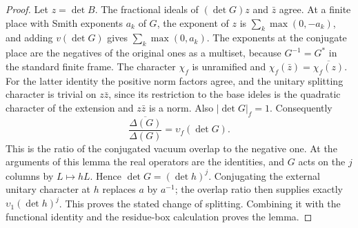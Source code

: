 \documentclass[a4paper,11pt]{article}
\theoremstyle{definition}
\theoremstyle{remark}
\numberwithin{equation}{section}
\begin{document}
\begin{proof}
Let \(z=\det B\). The fractional ideals of \((\det G)z\)
and \(\bar z\) agree. At a finite place with Smith exponents
\(a_k\) of \(G\), the exponent of \(z\) is
\(\sum_k\max(0,-a_k)\), and adding \(v(\det G)\) gives
\(\sum_k\max(0,a_k)\). The exponents at the conjugate place
are the negatives of the original ones as a multiset,
because \(G^{-1}=G^*\) in the standard finite frame.
The character \(\chi_f\) is unramified and
\(\chi_f(\bar z)=\overline{\chi_f(z)}\). For the latter
identity the positive norm factors agree, and the unitary
splitting character is trivial on \(z\bar z\), since its
restriction to the base ideles is the quadratic character of
the extension and \(z\bar z\) is a norm. Also \(|\det G|_f=1\).
Consequently
\[
        \frac{\overline{\Delta(G)}}{\Delta(G)}
                          =\upsilon_f(\det G).
\]
This is the ratio of the conjugated vacuum overlap to the
negative one. At the arguments of this lemma the real
operators are the identities, and \(G\) acts on the \(j\)
columns by \(L\mapsto hL\). Hence \(\det G=(\det h)^j\).
Conjugating the external unitary character at \(h\) replaces
\(a\) by \(a^{-1}\); the overlap ratio then supplies exactly
\(\upsilon_1(\det h)^j\). This proves the stated change of
splitting. Combining it with the functional identity and
the residue-box calculation proves the lemma.
\end{proof}
\end{document}
